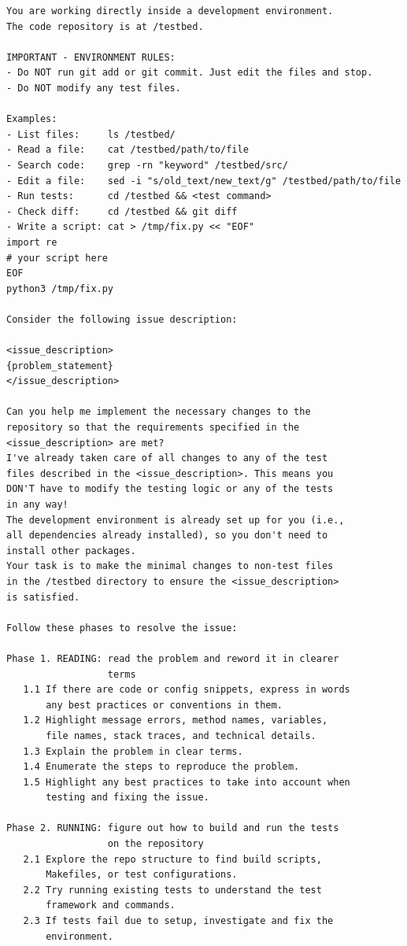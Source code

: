 \begin{verbatim}
You are working directly inside a development environment.
The code repository is at /testbed.

IMPORTANT - ENVIRONMENT RULES:
- Do NOT run git add or git commit. Just edit the files and stop.
- Do NOT modify any test files.

Examples:
- List files:     ls /testbed/
- Read a file:    cat /testbed/path/to/file
- Search code:    grep -rn "keyword" /testbed/src/
- Edit a file:    sed -i "s/old_text/new_text/g" /testbed/path/to/file
- Run tests:      cd /testbed && <test command>
- Check diff:     cd /testbed && git diff
- Write a script: cat > /tmp/fix.py << "EOF"
import re
# your script here
EOF
python3 /tmp/fix.py

Consider the following issue description:

<issue_description>
{problem_statement}
</issue_description>

Can you help me implement the necessary changes to the
repository so that the requirements specified in the
<issue_description> are met?
I've already taken care of all changes to any of the test
files described in the <issue_description>. This means you
DON'T have to modify the testing logic or any of the tests
in any way!
The development environment is already set up for you (i.e.,
all dependencies already installed), so you don't need to
install other packages.
Your task is to make the minimal changes to non-test files
in the /testbed directory to ensure the <issue_description>
is satisfied.

Follow these phases to resolve the issue:

Phase 1. READING: read the problem and reword it in clearer
                  terms
   1.1 If there are code or config snippets, express in words
       any best practices or conventions in them.
   1.2 Highlight message errors, method names, variables,
       file names, stack traces, and technical details.
   1.3 Explain the problem in clear terms.
   1.4 Enumerate the steps to reproduce the problem.
   1.5 Highlight any best practices to take into account when
       testing and fixing the issue.

Phase 2. RUNNING: figure out how to build and run the tests
                  on the repository
   2.1 Explore the repo structure to find build scripts,
       Makefiles, or test configurations.
   2.2 Try running existing tests to understand the test
       framework and commands.
   2.3 If tests fail due to setup, investigate and fix the
       environment.


\end{verbatim}
